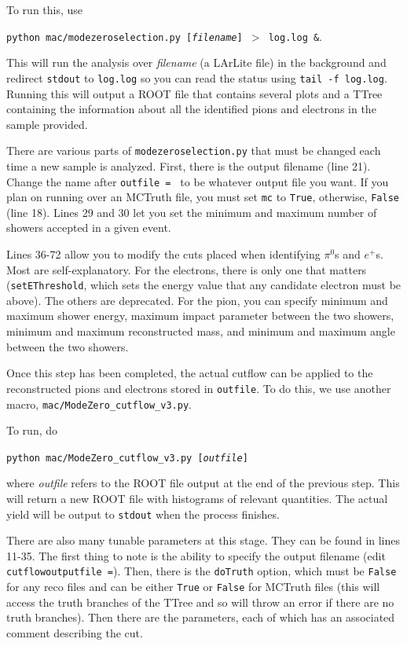 \documentclass[a4paper, 10pt]{article}
\begin{document}
To run this, use

\texttt{python mac/modezeroselection.py [\textit{filename}] $>$ log.log \&}.

\noindent
This will run the analysis over \textit{filename} (a LArLite file) in the background and redirect \texttt{stdout} to \texttt{log.log} so you can read the status using \texttt{tail -f log.log}. Running this will output a ROOT file that contains several plots and a TTree containing the information about all the identified pions and electrons in the sample provided.

There are various parts of \texttt{modezeroselection.py} that must be changed each time a new sample is analyzed. First, there is the output filename (line 21). Change the name after \texttt{outfile = } to be whatever output file you want. If you plan on running over an MCTruth file, you must set \texttt{mc} to \texttt{True}, otherwise, \texttt{False} (line 18). Lines 29 and 30 let you set the minimum and maximum number of showers accepted in a given event.

Lines 36-72 allow you to modify the cuts placed when identifying $\pi^{0}$s and $e^+$s. Most are self-explanatory. For the electrons, there is only one that matters (\texttt{setEThreshold}, which sets the energy value that any candidate electron must be above). The others are deprecated. For the pion, you can specify minimum and maximum shower energy, maximum impact parameter between the two showers, minimum and maximum reconstructed mass, and minimum and maximum angle between the two showers.

Once this step has been completed, the actual cutflow can be applied to the reconstructed pions and electrons stored in \texttt{outfile}. To do this, we use another macro, \texttt{mac/ModeZero\_cutflow\_v3.py}.

To run, do

\texttt{python mac/ModeZero\_cutflow\_v3.py [\textit{outfile}]}

\noindent
where \textit{outfile} refers to the ROOT file output at the end of the previous step. This will return a new ROOT file with histograms of relevant quantities. The actual yield will be output to \texttt{stdout} when the process finishes.

There are also many tunable parameters at this stage. They can be found in lines 11-35. The first thing to note is the ability to specify the output filename (edit \texttt{cutflowoutputfile =}). Then, there is the \texttt{doTruth} option, which must be \texttt{False} for any reco files and can be either \texttt{True} or \texttt{False} for MCTruth files (this will access the truth branches of the TTree and so will throw an error if there are no truth branches). Then there are the parameters, each of which has an associated comment describing the cut.
\end{document}
